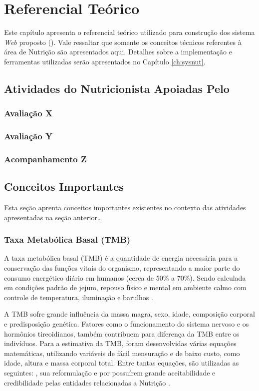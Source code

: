 \chapter{Referencial Teórico} \label{ch:referencial}

{\color{red}
Este capítulo apresenta o referencial teórico utilizado para construção dos sistema \textit{Web} proposto (\SysNut). Vale ressaltar que somente os conceitos técnicos referentes à área de Nutrição são apresentados aqui. Detalhes sobre a implementação e ferramentas utilizadas serão apresentados no Capítulo \ref{ch:sysnut}.
}

\section{Atividades do Nutricionista Apoiadas Pelo \SysNut}

{\color{red}
\subsection{Avaliação X}
\subsection{Avaliação Y}
\subsection{Acompanhamento Z}

\section{Conceitos Importantes}

Esta seção aprenta conceitos importantes existentes no contexto das atividades apresentadas na seção anterior\ldots
}


\subsection{Taxa Metabólica Basal (TMB)}

A taxa metabólica basal (TMB) é a quantidade de energia necessária para a
conservação das funções vitais do organismo, representando a maior parte do
consumo energético diário em humanos (cerca de 50\% a 70\%). Sendo calculada em
condições padrão de jejum, repouso físico e mental em ambiente calmo com controle
de temperatura, iluminação e barulhos \cite{ruiz} \cite{harris1}.

A TMB sofre grande influência da massa magra, sexo, idade, composição
corporal e predisposição genética. Fatores como o funcionamento do sistema nervoso
e os hormônios tireoidianos, também contribuem para diferença da TMB entre os
indivíduos. Para a estimativa da TMB, foram desenvolvidas várias equações
matemáticas, utilizando variáveis de fácil mensuração e de baixo custo, como idade,
altura e massa corporal total. Entre tantas equações, são utilizadas as seguintes:
, sua reformulação  e  por possuírem grande
aceitabilidade e credibilidade pelas entidades relacionadas a Nutrição \cite{weijs}.

